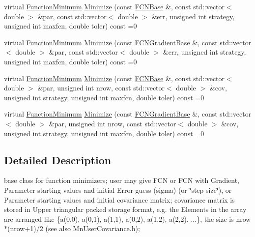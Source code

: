 \begin{DoxyCompactItemize}
virtual \mbox{\hyperlink{classROOT_1_1Minuit2_1_1FunctionMinimum}{Function\+Minimum}} \mbox{\hyperlink{classROOT_1_1Minuit2_1_1FunctionMinimizer_aa664d755554be28f42be8270b8c35139}{Minimize}} (const \mbox{\hyperlink{classROOT_1_1Minuit2_1_1FCNBase}{F\+C\+N\+Base}} \&, const std\+::vector$<$ double $>$ \&par, const std\+::vector$<$ double $>$ \&err, unsigned int strategy, unsigned int maxfcn, double toler) const =0
\item 
virtual \mbox{\hyperlink{classROOT_1_1Minuit2_1_1FunctionMinimum}{Function\+Minimum}} \mbox{\hyperlink{classROOT_1_1Minuit2_1_1FunctionMinimizer_ac6063af1cb58f0fd75b16d3cebc49f54}{Minimize}} (const \mbox{\hyperlink{classROOT_1_1Minuit2_1_1FCNGradientBase}{F\+C\+N\+Gradient\+Base}} \&, const std\+::vector$<$ double $>$ \&par, const std\+::vector$<$ double $>$ \&err, unsigned int strategy, unsigned int maxfcn, double toler) const =0
\item 
virtual \mbox{\hyperlink{classROOT_1_1Minuit2_1_1FunctionMinimum}{Function\+Minimum}} \mbox{\hyperlink{classROOT_1_1Minuit2_1_1FunctionMinimizer_a22d44dc8c018424a98ce8928ee7c5613}{Minimize}} (const \mbox{\hyperlink{classROOT_1_1Minuit2_1_1FCNBase}{F\+C\+N\+Base}} \&, const std\+::vector$<$ double $>$ \&par, unsigned int nrow, const std\+::vector$<$ double $>$ \&cov, unsigned int strategy, unsigned int maxfcn, double toler) const =0
\item 
virtual \mbox{\hyperlink{classROOT_1_1Minuit2_1_1FunctionMinimum}{Function\+Minimum}} \mbox{\hyperlink{classROOT_1_1Minuit2_1_1FunctionMinimizer_a467a9dd60665c9b31969fe55d73b6401}{Minimize}} (const \mbox{\hyperlink{classROOT_1_1Minuit2_1_1FCNGradientBase}{F\+C\+N\+Gradient\+Base}} \&, const std\+::vector$<$ double $>$ \&par, unsigned int nrow, const std\+::vector$<$ double $>$ \&cov, unsigned int strategy, unsigned int maxfcn, double toler) const =0
\end{DoxyCompactItemize}


\subsection{Detailed Description}
base class for function minimizers; user may give F\+CN or F\+CN with Gradient, Parameter starting values and initial Error guess (sigma) (or \char`\"{}step size\char`\"{}), or Parameter starting values and initial covariance matrix; covariance matrix is stored in Upper triangular packed storage format, e.\+g. the Elements in the array are arranged like \{a(0,0), a(0,1), a(1,1), a(0,2), a(1,2), a(2,2), ...\}, the size is nrow$\ast$(nrow+1)/2 (see also Mn\+User\+Covariance.\+h); 

